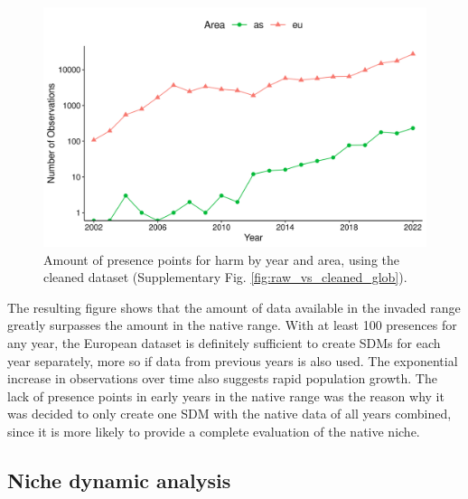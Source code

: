 \documentclass[12pt,a4paper]{article}
\begin{document}
\begin{figure}[!h]
    \centering
    \includegraphics[width = 0.9\linewidth]{"../../R/figures/pres-per-year-log.png"}
    \caption{\label{fig:pres_per_year_log} Amount of presence points for \gls{harm} by year and area, using the cleaned dataset (Supplementary Fig. \ref{fig:raw_vs_cleaned_glob}).}
\end{figure}

The resulting figure shows that the amount of data available in the invaded range greatly surpasses the amount in the native range.
With at least 100 presences for any year, the European dataset is definitely sufficient to create SDMs for each year separately, more so if data from previous years is also used.
The exponential increase in observations over time also suggests rapid population growth.
The lack of presence points in early years in the native range was the reason why it was decided to only create one SDM with the native data of all years combined, since it is more likely to provide a complete evaluation of the native niche.

\subsection{Niche dynamic analysis} \label{ssec:niche_dyn_analysis}
\end{document}
